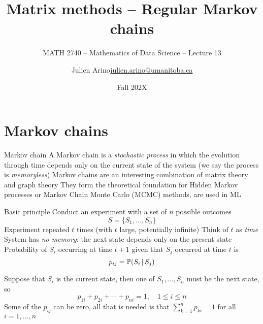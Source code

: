 \documentclass[aspectratio=169]{beamer}\usepackage[]{graphicx}\usepackage[]{xcolor}
\subtitle{MATH 2740 -- Mathematics of Data Science -- Lecture 13}
\author{\texorpdfstring{Julien Arino\newline\url{julien.arino@umanitoba.ca}}{Julien Arino}}
\institute{Department of Mathematics @ University of Manitoba}
\date{Fall 202X}
\title{Matrix methods -- Regular Markov chains}
\begin{document}
\setcounter{theorem}{89}



\section{Markov chains}

\begin{frame}{Markov chain}
	A Markov chain is a \emph{stochastic process} in which the evolution through time depends only on the current state of the system (we say the process is \emph{memoryless})
	\vfill
	Markov chains are an interesting combination of matrix theory and graph theory
	\vfill
	They form the theoretical foundation for Hidden Markov processes or Markov Chain Monte Carlo (MCMC) methods, are used in ML
\end{frame}



\begin{frame}{Basic principle}
Conduct an experiment with a set of $n$ possible outcomes
\[
S=\{S_1,\dots, S_n\}
\]
\vfill
Experiment repeated $t$ times (with $t$ large, potentially infinite)
\vfill
Think of $t$ as \emph{time}
\vfill 
System has \emph{no memory}: the next state depends only on the present state
\vfill
Probability of $S_i$ occurring at time $t+1$ given that $S_j$ occurred at time $t$ is
\[
p_{ij}=\mathbb{P}(S_i\,|\,S_j)
\]
\end{frame}


\begin{frame} 
Suppose that $S_i$ is the current state, then one of $S_1, \ldots,S_n$ must be the next state, so
\[
p_{1i}+p_{2i}+\cdots+p_{ni}=1, \quad 1\leq i\leq n
\]
\vfill
Some of the $p_{ij}$ can be zero, all that is needed is that $\sum_{k=1}^n p_{ki}=1$ for all $i=1,\ldots,n$
\end{frame}
\end{document}
